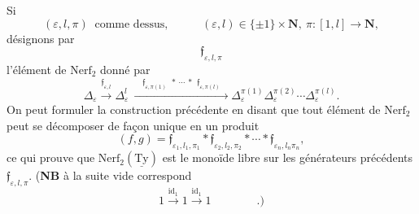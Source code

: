 \documentclass[11pt]{article}
\newcommand{\uTy}{\underline{\mathrm{Ty}}}
\begin{document}
Si
\[
(\varepsilon,l,\pi)\ \text{ comme dessus,} \qquad\quad (\varepsilon,l)\in\{\pm1\}\times\mathbf{N},\ \pi : [1,l]\longrightarrow\mathbf{N},
\]
désignons par
\[
\mathfrak{f}_{\varepsilon,l,\pi}
\]
l'élément de $\mathrm{Nerf}_2$ donné par
\[
\Delta_\varepsilon\xrightarrow{\mathfrak{f}_{\varepsilon,l}}\Delta^l_\varepsilon\ \xrightarrow{\quad\mathfrak{f}_{\varepsilon,\pi(1)}\ \ *\ \cdots\ *\ \ \mathfrak{f}_{\varepsilon,\pi(l)}\quad}\Delta^{\pi(1)}_\varepsilon\Delta^{\pi(2)}_\varepsilon\cdots\Delta^{\pi(l)}_\varepsilon.
\]
On peut formuler la construction précédente en disant que tout élément de $\mathrm{Nerf}_2$ peut se décomposer de façon unique en un produit
\[
(f,g) = \mathfrak{f}_{\varepsilon_1,l_1,\pi_1}*\mathfrak{f}_{\varepsilon_2,l_2,\pi_2}*\cdots*\mathfrak{f}_{\varepsilon_n,l_n\pi_n}, %
\]
ce qui prouve que $\mathrm{Nerf}_2(\uTy)$ est le monoïde libre sur les générateurs précédents $\mathfrak{f}_{\varepsilon,l,\pi}$. (\textbf{NB} à la suite vide correspond
\[
1\xrightarrow{\mathrm{id}_1}1\xrightarrow{\mathrm{id}_1}1 \qquad\qquad .)
\]
\end{document}
